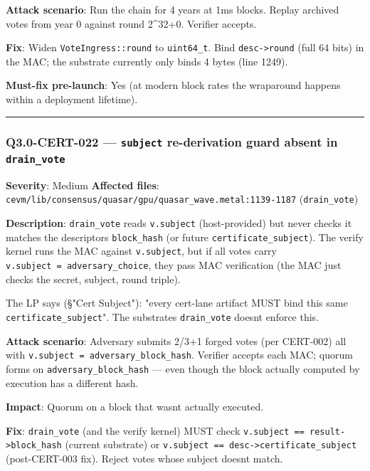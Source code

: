 \documentclass[
]{article}
\begin{document}
\textbf{Attack scenario}: Run the chain for 4 years at 1ms blocks.
Replay archived votes from year 0 against round 2\^{}32+0. Verifier
accepts.

\textbf{Fix}: Widen \texttt{VoteIngress::round} to \texttt{uint64\_t}.
Bind \texttt{desc-\textgreater{}round} (full 64 bits) in the MAC; the
substrate currently only binds 4 bytes (line 1249).

\textbf{Must-fix pre-launch}: Yes (at modern block rates the wraparound
happens within a deployment lifetime).

\begin{center}\rule{0.5\linewidth}{0.5pt}\end{center}

\subsubsection{\texorpdfstring{Q3.0-CERT-022 --- \texttt{subject}
re-derivation guard absent in
\texttt{drain\_vote}}{Q3.0-CERT-022 --- subject re-derivation guard absent in drain\_vote}}\label{q30-cert-022--subject-re-derivation-guard-absent-in-drain_vote}

\textbf{Severity}: Medium \textbf{Affected files}:
\texttt{cevm/lib/consensus/quasar/gpu/quasar\_wave.metal:1139-1187}
(\texttt{drain\_vote})

\textbf{Description}: \texttt{drain\_vote} reads \texttt{v.subject}
(host-provided) but never checks it matches the
descriptor\textquotesingle s \texttt{block\_hash} (or future
\texttt{certificate\_subject}). The verify kernel runs the MAC against
\texttt{v.subject}, but if all votes carry
\texttt{v.subject\ =\ adversary\_choice}, they pass MAC verification
(the MAC just checks the secret, subject, round triple).

The LP says (§"Cert Subject"): "every cert-lane artifact MUST bind this
same \texttt{certificate\_subject}". The substrate\textquotesingle s
\texttt{drain\_vote} doesn\textquotesingle t enforce this.

\textbf{Attack scenario}: Adversary submits 2/3+1 forged votes (per
CERT-002) all with \texttt{v.subject\ =\ adversary\_block\_hash}.
Verifier accepts each MAC; quorum forms on
\texttt{adversary\_block\_hash} --- even though the block actually
computed by execution has a different hash.

\textbf{Impact}: Quorum on a block that wasn\textquotesingle t actually
executed.

\textbf{Fix}: \texttt{drain\_vote} (and the verify kernel) MUST check
\texttt{v.subject\ ==\ result-\textgreater{}block\_hash} (current
substrate) or
\texttt{v.subject\ ==\ desc-\textgreater{}certificate\_subject}
(post-CERT-003 fix). Reject votes whose subject doesn\textquotesingle t
match.
\end{document}

